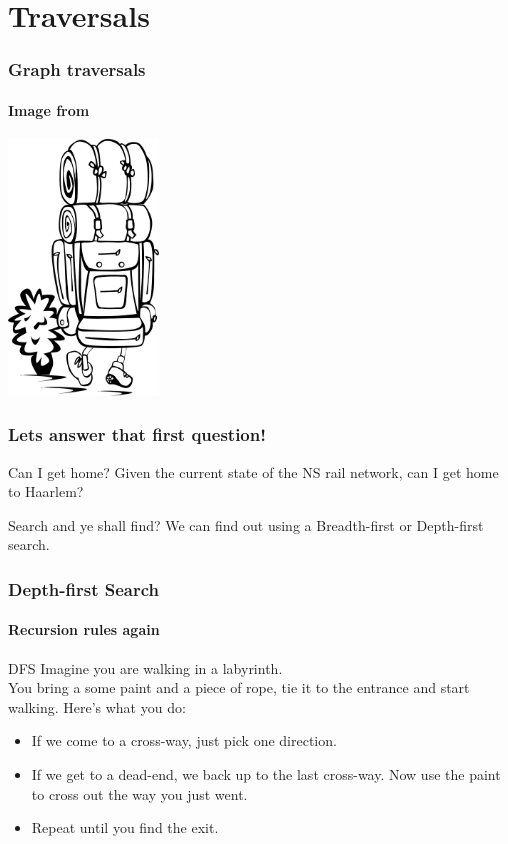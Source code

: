 \section{Traversals}%
\label{sec:traversals}

\begin{frame}
	\frametitle{Graph traversals}
	\framesubtitle{\scriptsize Image from }
	
	\begin{center}
		\includegraphics[width=0.3\textwidth]{figures/backpacking.png}\\
	\end{center}
\end{frame}

\begin{frame}
	\frametitle{Lets answer that first question!}

	\begin{problemblock}{Can I get home?}
		Given the current state of the NS rail network, can I get home to Haarlem?
	\end{problemblock}
	\pause
	\begin{answerblock}{Search and ye shall find?}
		We can find out using a Breadth-first or Depth-first search.
	\end{answerblock}
\end{frame}

\begin{frame}
	\frametitle{Depth-first Search}
	\framesubtitle{Recursion rules again}

		\begin{block}{DFS}
			Imagine you are walking in a labyrinth.\\
			\pause
			You bring a some paint and a piece of rope, tie it to the entrance and start walking. Here's what you do:\\
			\pause
			\begin{itemize}
				\item If we come to a cross-way, just pick one direction.
					\pause
				\item If we get to a dead-end, we back up to the last cross-way. Now use the paint to cross out the way you just
					went.
					\pause
				\item Repeat until you find the exit.
			\end{itemize}
		\end{block}	
	
\end{frame}

